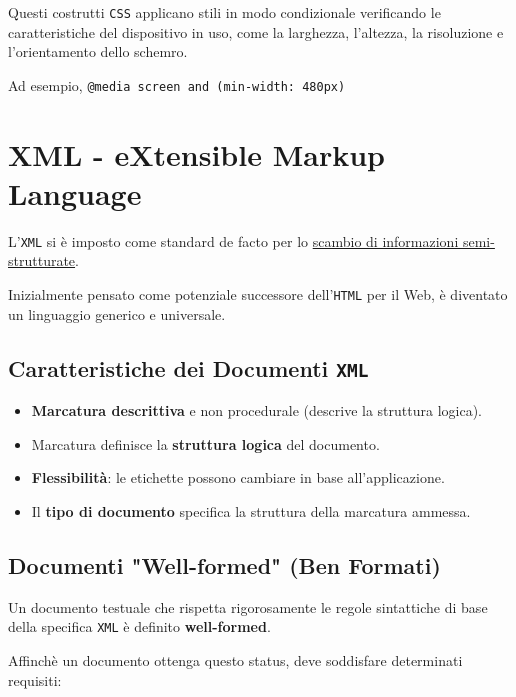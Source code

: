 Questi costrutti \texttt{CSS} applicano stili in modo condizionale verificando le caratteristiche del dispositivo in uso, come la larghezza, l'altezza, la risoluzione e l'orientamento dello schemro.

Ad esempio, \texttt{@media screen and (min-width: 480px)}

\chapter{XML - eXtensible Markup Language}
L'\texttt{XML} si è imposto come standard de facto per lo \uline{scambio di informazioni semi-strutturate}.

Inizialmente pensato come potenziale successore dell'\texttt{HTML} per il Web, è diventato un linguaggio generico e universale.

\section{Caratteristiche dei Documenti \texttt{XML}}
\begin{itemize}
    \item \textbf{Marcatura descrittiva} e non procedurale (descrive la struttura logica).
    \item Marcatura definisce la \textbf{struttura logica} del documento.
    \item \textbf{Flessibilità}: le etichette possono cambiare in base all'applicazione.
    \item Il \textbf{tipo di documento} specifica la struttura della marcatura ammessa.
\end{itemize}

\section{Documenti "Well-formed" (Ben Formati)}
Un documento testuale che rispetta rigorosamente le regole sintattiche di base della specifica \texttt{XML} è definito \textbf{well-formed}.

Affinchè un documento ottenga questo status, deve soddisfare determinati requisiti:

